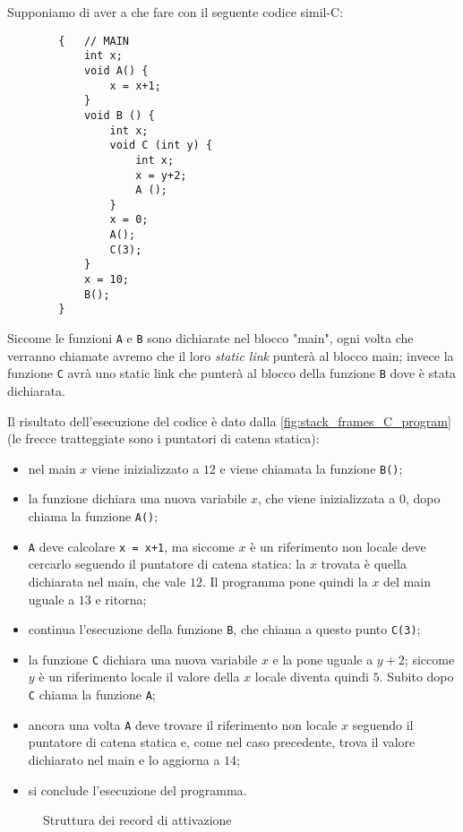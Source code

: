 \begin{example}
    Supponiamo di aver a che fare con il seguente codice simil-C:
    \begin{verbatim}
        {   // MAIN
            int x;
            void A() {
                x = x+1;
            }
            void B () {
                int x;
                void C (int y) {
                    int x;
                    x = y+2;
                    A ();
                }
                x = 0;
                A();
                C(3);
            }
            x = 10;
            B();
        }
    \end{verbatim}

    Siccome le funzioni \texttt{A} e \texttt{B} sono dichiarate nel blocco "main", ogni volta che verranno chiamate avremo che il loro \emph{static link} punterà al blocco main; invece la funzione \texttt{C} avrà uno static link che punterà al blocco della funzione \texttt{B} dove è stata dichiarata.

    Il risultato dell'esecuzione del codice è dato dalla \autoref{fig:stack_frames_C_program} (le frecce tratteggiate sono i puntatori di catena statica):
    \begin{itemize}
        \item nel main $x$ viene inizializzato a $12$ e viene chiamata la funzione \texttt{B()};
        \item la funzione dichiara una nuova variabile $x$, che viene inizializzata a $0$, dopo chiama la funzione \texttt{A()};
        \item \texttt{A} deve calcolare \texttt{x = x+1}, ma siccome $x$ è un riferimento non locale deve cercarlo seguendo il puntatore di catena statica: la $x$ trovata è quella dichiarata nel main, che vale $12$. Il programma pone quindi la $x$ del main uguale a $13$ e ritorna;
        \item continua l'esecuzione della funzione \texttt{B}, che chiama a questo punto \texttt{C(3)};
        \item la funzione \texttt{C} dichiara una nuova variabile $x$ e la pone uguale a $y+2$; siccome $y$ è un riferimento locale il valore della $x$ locale diventa quindi $5$. Subito dopo \texttt{C} chiama la funzione \texttt{A};
        \item ancora una volta \texttt{A} deve trovare il riferimento non locale $x$ seguendo il puntatore di catena statica e, come nel caso precedente, trova il valore dichiarato nel main e lo aggiorna a $14$;
        \item si conclude l'esecuzione del programma.
    \end{itemize}


    \begin{figure}
        \centering
        
        \caption{Struttura dei record di attivazione}
        \label{fig:stack_frames_C_program}
    \end{figure}
\end{example}


